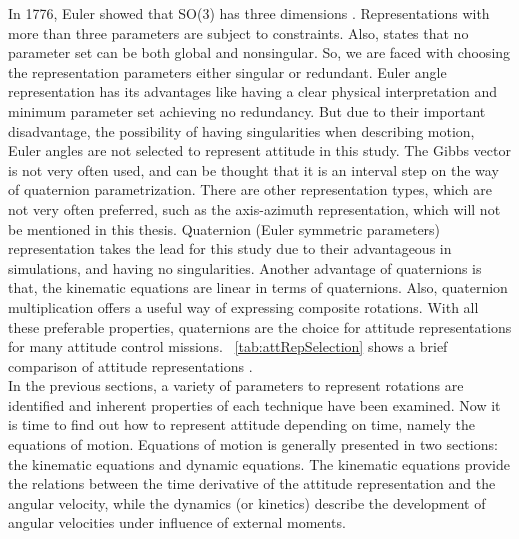 In 1776, Euler showed that SO(3) has three dimensions \cite{stuelpnagel1964parametrization}. 
Representations with more than three parameters are subject to constraints. 
Also, \cite{stuelpnagel1964parametrization} states that no parameter set 
can be both global and nonsingular. 
So, we are faced with choosing the representation parameters either singular or redundant. 
Euler angle representation has its advantages like having a clear physical interpretation and minimum parameter set achieving no redundancy. 
But due to their important disadvantage, the possibility of having singularities when describing motion, Euler angles are not selected to represent attitude in this study.
The Gibbs vector is not very often used, and can be thought that it is an interval step on the way of quaternion parametrization. 
There are other representation types, which are not very often 
preferred, such as the axis-azimuth representation, which will not be mentioned  in this thesis. 
Quaternion (Euler symmetric parameters) representation takes the lead for this study due to their advantageous in simulations, and having no singularities.
Another advantage of quaternions is that, the kinematic equations are linear in terms of quaternions. 
Also, quaternion multiplication offers a useful way of expressing composite rotations. 
With all these preferable properties, quaternions are the choice for attitude representations for many attitude control missions. ~\ref{tab:attRepSelection} shows a brief comparison of attitude representations \cite{bak1999spacecraft}.\\
In the previous sections, a variety of parameters to represent rotations are identified and inherent properties of each technique have been examined. 
Now it is time to find out how to represent attitude depending on time, namely the equations of motion. 
Equations of motion is generally presented in two sections: the kinematic equations and dynamic equations. 
The kinematic equations provide the relations between the time derivative of the attitude representation and the angular velocity, while the dynamics (or kinetics) describe the development of angular velocities under influence of external moments.


